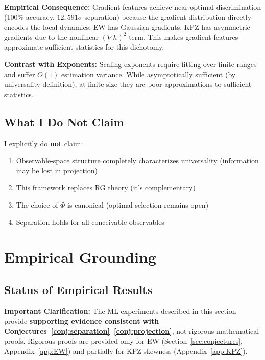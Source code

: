 \documentclass[aps,pre,reprint,amsmath,amssymb,superscriptaddress]{revtex4-2}
\begin{document}
\textbf{Empirical Consequence:} Gradient features achieve near-optimal discrimination (100\% accuracy, $12{,}591\sigma$ separation) because the gradient distribution directly encodes the local dynamics: EW has Gaussian gradients, KPZ has asymmetric gradients due to the nonlinear $(\nabla h)^2$ term. This makes gradient features approximate sufficient statistics for this dichotomy.

\textbf{Contrast with Exponents:} Scaling exponents require fitting over finite ranges and suffer $O(1)$ estimation variance. While asymptotically sufficient (by universality definition), at finite size they are poor approximations to sufficient statistics.

\subsection{What I Do Not Claim}

I explicitly do \textbf{not} claim:
\begin{enumerate}
\item Observable-space structure completely characterizes universality (information may be lost in projection)
\item This framework replaces RG theory (it's complementary)
\item The choice of $\Phi$ is canonical (optimal selection remains open)
\item Separation holds for all conceivable observables
\end{enumerate}

\section{Empirical Grounding}
\label{sec:empirical}

\subsection{Status of Empirical Results}

\textbf{Important Clarification:} The ML experiments described in this section provide \textbf{supporting evidence consistent with Conjectures~\ref{conj:separation}--\ref{conj:projection}}, not rigorous mathematical proofs. Rigorous proofs are provided only for EW (Section~\ref{sec:conjectures}, Appendix~\ref{app:EW}) and partially for KPZ skewness (Appendix~\ref{app:KPZ}).
\end{document}
